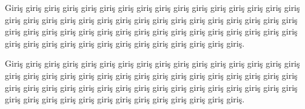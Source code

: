 Giriş giriş giriş giriş giriş giriş giriş giriş giriş giriş giriş giriş giriş giriş giriş giriş giriş giriş giriş giriş giriş giriş giriş giriş giriş giriş giriş giriş giriş giriş giriş giriş giriş giriş giriş giriş giriş giriş giriş giriş giriş giriş giriş giriş giriş giriş giriş giriş giriş giriş giriş giriş giriş giriş giriş giriş giriş giriş giriş giriş giriş.

Giriş giriş giriş giriş giriş giriş giriş giriş giriş giriş giriş giriş giriş giriş giriş giriş giriş giriş giriş giriş giriş giriş giriş giriş giriş giriş giriş giriş giriş giriş giriş giriş giriş giriş giriş giriş giriş giriş giriş giriş giriş giriş giriş giriş giriş giriş giriş giriş giriş giriş giriş giriş giriş giriş giriş giriş giriş giriş giriş giriş giriş.
